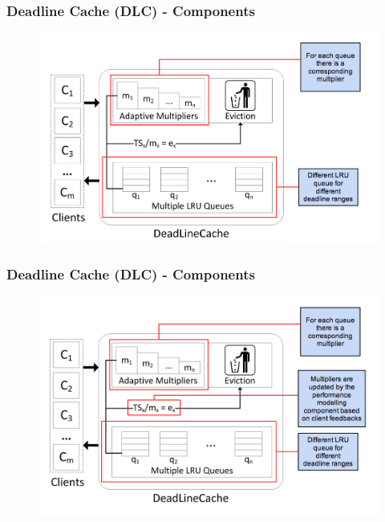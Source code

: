 \documentclass{beamer}
\begin{document}
\begin{frame}
  \frametitle{Deadline Cache (DLC) - Components}
  \begin{figure}
    \begin{center}
      \centerline{\includegraphics[scale=0.35]{img/DLC_ARC_2.png}}
    \end{center}
  \end{figure}
\end{frame}


\begin{frame}
  \frametitle{Deadline Cache (DLC) - Components}
  \begin{figure}
    \begin{center}
      \centerline{\includegraphics[scale=0.35]{img/DLC_ARC_3.png}}
    \end{center}
  \end{figure}
\end{frame}
\end{document}
